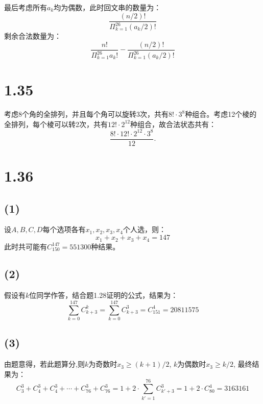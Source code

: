 \documentclass[UTF8,oneside]{article}
\begin{document}
最后考虑所有$a_k$均为偶数，此时回文串的数量为：
\[
    \frac{(n/2)!}{\Pi_{k=1}^{26} (a_k/2)!}
\]
剩余合法数量为：
\[
    \frac{n!}{\Pi_{k=1}^{26}a_k!} - \frac{(n/2)!}{\Pi_{k=1}^{26} (a_k/2)!}
\]

\section{1.35}
考虑8个角的全排列，并且每个角可以旋转3次，共有$8!\cdot 3^8$种组合。考虑12个棱的全排列，每个棱可以转2次，共有$12!\cdot 2^{12}$种组合，故合法状态共有：
\[
    \frac{8!\cdot 12!\cdot 2^{12}\cdot 3^8}{12}.
\]

\section{1.36}
\subsection{(1)} 设$A,B,C,D$每个选项各有$x_1,x_2,x_3,x_4$个人选，则：
\[
    x_1 + x_2 + x_3 + x_4 = 147
\]
此时共可能有$C^{147}_{150}=551300$种结果。

\subsection{(2)} 假设有$k$位同学作答，结合题1.28证明的公式，结果为：
\[
    \sum_{k=0}^{147} C^{k}_{k+3} = \sum_{k=0}^{147} C^{3}_{k+3} = C_{151}^4 = 20811575
\]

\subsection{(3)} 由题意得，若此题算分,则$k$为奇数时$x_3 \ge (k+1)/2$, $k$为偶数时$x_3\ge k/2$, 最终结果为：
\[
    C^3_3 + C^3_4 + C^3_4 + \cdots + C^3_{76} + C^3_{76} = 1 + 2\cdot \sum_{k'=1}^{76} C^3_{k'+3} = 1 + 2\cdot C_{80}^4 = 3163161
\]
\end{document}
